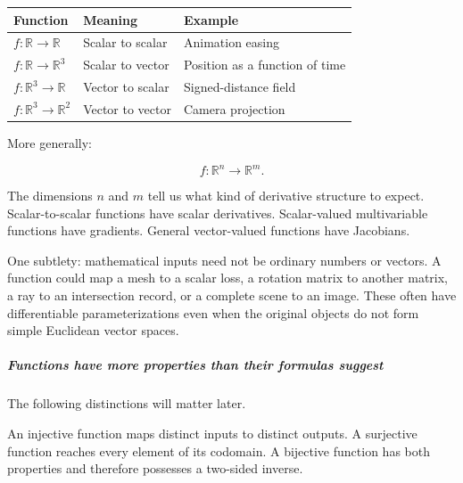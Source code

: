 {\def\LTcaptype{none} %
\begin{longtable}[]{@{}
  >{\raggedright\arraybackslash}p{}
  >{\raggedright\arraybackslash}p{}
  >{\raggedright\arraybackslash}p{}@{}}
\toprule\noalign{}
\begin{minipage}[b]{\linewidth}\raggedright
Function
\end{minipage} & \begin{minipage}[b]{\linewidth}\raggedright
Meaning
\end{minipage} & \begin{minipage}[b]{\linewidth}\raggedright
Example
\end{minipage} \\
\midrule\noalign{}
\endhead
\bottomrule\noalign{}
\endlastfoot
\(f:\mathbb R\to\mathbb R\) & Scalar to scalar & Animation easing \\
\(f:\mathbb R\to\mathbb R^3\) & Scalar to vector & Position as a function of time \\
\(f:\mathbb R^3\to\mathbb R\) & Vector to scalar & Signed-distance field \\
\(f:\mathbb R^3\to\mathbb R^2\) & Vector to vector & Camera projection \\
\end{longtable}
}

More generally:

\[
f:\mathbb R^n\rightarrow\mathbb R^m.
\]

The dimensions \(n\) and \(m\) tell us what kind of derivative structure to expect. Scalar-to-scalar functions have scalar derivatives. Scalar-valued multivariable functions have gradients. General vector-valued functions have Jacobians.

One subtlety: mathematical inputs need not be ordinary numbers or vectors. A function could map a mesh to a scalar loss, a rotation matrix to another matrix, a ray to an intersection record, or a complete scene to an image. These often have differentiable parameterizations even when the original objects do not form simple Euclidean vector spaces.

\subparagraph{Functions have more properties than their formulas suggest}\label{01-foundations-i-ch020-functions-have-more-properties-than-their-formulas-suggest}

The following distinctions will matter later.

An injective function maps distinct inputs to distinct outputs. A surjective function reaches every element of its codomain. A bijective function has both properties and therefore possesses a two-sided inverse.

